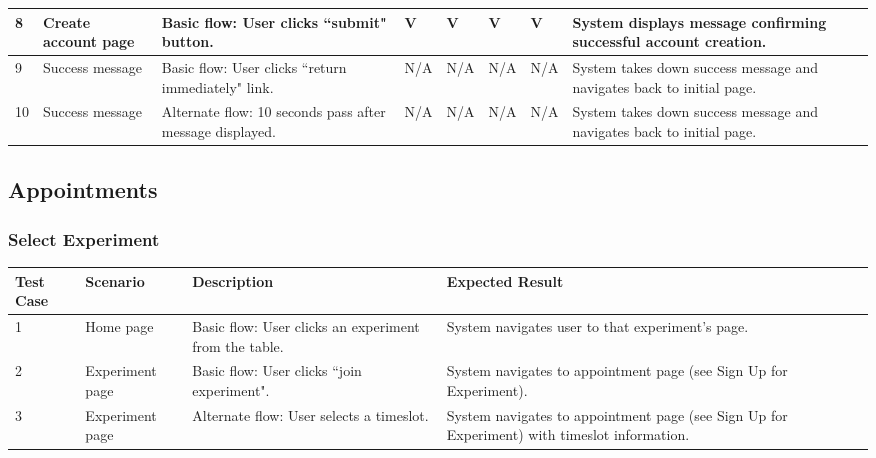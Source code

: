 \begin{landscape}
\begin{table}[!h]
\begin{tabular}{|l|p{1in}|p{2.25in}|l|l|l|l|p{2.25in}|}
        8 & Create account page & Basic flow: User clicks ``submit" button. & V & V & V & V & System displays message confirming successful account creation. \\ \hline
        9 & Success message & Basic flow: User clicks ``return immediately" link. & N/A & N/A & N/A & N/A & System takes down success message and navigates back to initial page. \\ \hline
        10 & Success message & Alternate flow: 10 seconds pass after message displayed. & N/A & N/A & N/A & N/A & System takes down success message and navigates back to initial page. \\ \hline
    \end{tabular}
\end{table}

\subsection{Appointments}
\subsubsection{Select Experiment}
\begin{table}[!h]
    \begin{tabular}{|l|l|p{2.5in}|p{2.5in}|}
        \hline
        Test Case & Scenario & Description & Expected Result \\ \hline
        1 & Home page & Basic flow: User clicks an experiment from the table. & System navigates user to that experiment's page. \\ \hline
        2 & Experiment page & Basic flow: User clicks ``join experiment". & System navigates to appointment page (see Sign Up for Experiment). \\ \hline
        3 & Experiment page & Alternate flow: User selects a timeslot. & System navigates to appointment page (see Sign Up for Experiment) with timeslot information. \\ \hline
    \end{tabular}
\end{table}


\end{landscape}
